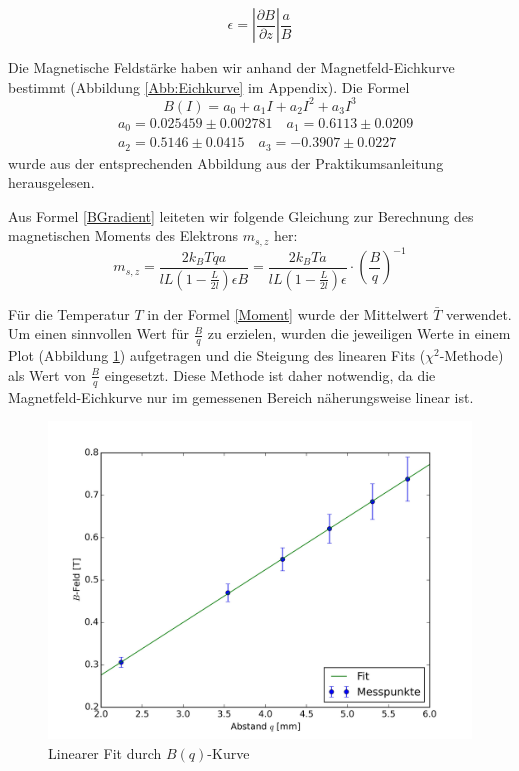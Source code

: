 \documentclass[a4paper,parskip,11pt, DIV12]{scrreprt}
\begin{document}
\begin{equation} \label{BGradient}
\epsilon = \left|\frac{\partial B}{\partial z}\right| \frac{a}{B}
\end{equation}

Die Magnetische Feldstärke haben wir anhand der Magnetfeld-Eichkurve bestimmt (Abbildung \ref{Abb:Eichkurve} im Appendix). Die Formel \begin{equation}
B(I) = a_0 + a_1 I + a_2 I^2 + a_3 I^3
\end{equation} \begin{align*}
&a_0 = 0.025459 \pm 0.002781 \quad
a_1 = 0.6113 \pm 0.0209 \\ 
&a_2 = 0.5146 \pm 0.0415 \quad
a_3 = -0.3907 \pm 0.0227
\end{align*} wurde aus der entsprechenden Abbildung aus der Praktikumsanleitung herausgelesen.

Aus Formel \ref{BGradient} leiteten wir folgende Gleichung zur Berechnung des magnetischen Moments des Elektrons $m_{s,z}$ her:
\begin{equation} \label{Moment}
m_{s,z}=\frac{2k_BTqa}{lL(1-\frac{L}{2l})\epsilon B} = \frac{2k_BTa}{lL(1-\frac{L}{2l})\epsilon} \cdot \left(\frac{B}{q}\right)^{-1}
\end{equation}

Für die Temperatur $T$ in der Formel \ref{Moment} wurde der Mittelwert $\bar{T}$ verwendet. Um einen sinnvollen Wert für $\frac{B}{q}$ zu erzielen, wurden die jeweiligen Werte in einem Plot (Abbildung \ref{Abb:B/q}) aufgetragen und die Steigung des linearen Fits ($\chi^2$-Methode) als Wert von $\frac{B}{q}$ eingesetzt. Diese Methode ist daher notwendig, da die Magnetfeld-Eichkurve nur im gemessenen Bereich näherungsweise linear ist.

\begin{figure}[H]
\centering
\includegraphics[scale=0.1]{Plot}
\caption[Plot]{Linearer Fit durch $B(q)$-Kurve}
\label{Abb:B/q}
\end{figure}
\end{document}

